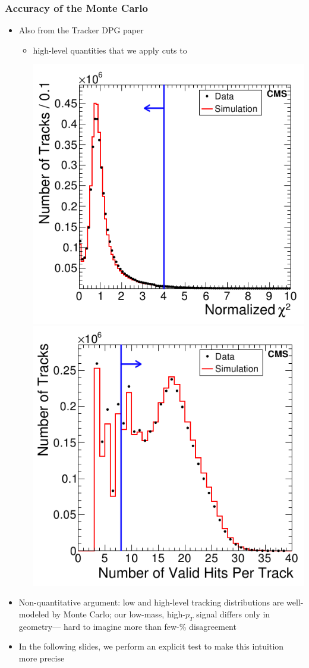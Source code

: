 \documentclass[compress]{beamer}
\begin{document}
\begin{frame}
\frametitle{Accuracy of the Monte Carlo}
\label{page:tracking_datamc}

\begin{itemize}
\item Also from the Tracker DPG paper
\begin{itemize}
\item high-level quantities that we apply cuts to

\includegraphics[width=0.5\linewidth]{normalized_chi2.png}
\includegraphics[width=0.5\linewidth]{number_of_hits.png}
\end{itemize}

\item Non-quantitative argument: low and high-level tracking
  distributions are well-modeled by Monte Carlo; our low-mass,
  high-$p_T$ signal differs only in geometry--- hard to imagine more
  than few-\% disagreement

\item In the following slides, we perform an explicit test to make
  this intuition more precise
\end{itemize}
\end{frame}
\end{document}
